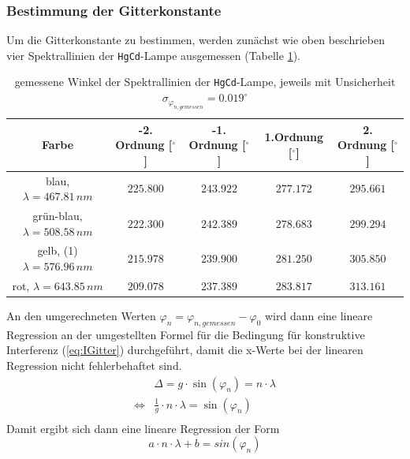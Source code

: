 \documentclass[a4paper, 11pt]{article}
\begin{document}
\subsubsection{Bestimmung der Gitterkonstante}
Um die Gitterkonstante zu bestimmen, werden zunächst wie oben beschrieben vier Spektrallinien der \texttt{HgCd}-Lampe ausgemessen (Tabelle \ref{table: gemWinkel}).
\begin{table}[H]
	\large
	\centering
	\begin{tabular}{|c|c|c|c|c|}
		\hline 
		Farbe & -2. Ordnung [$ ^\circ$]  &   -1. Ordnung [$ ^\circ$] &   1.Ordnung [$ ^\circ$]    &   2. Ordnung [$ ^\circ$] \\
		\hline
		blau, $\lambda = 467.81 \, nm$    &   $225.800 $   &   $243.922$    &   $277.172$    &   $295.661$ \\
		\hline grün-blau, $\lambda = 508.58 \, nm$    &   $222.300 $   &   $242.389$    &   $278.683$    &   $299.294$ \\
		\hline
		gelb, (1) $\lambda = 576.96 \, nm$    &   $215.978 $   &   $239.900$    &   $281.250$    &   $305.850$ \\
		\hline
		rot, $\lambda = 643.85 \, nm$    &   $209.078 $   &   $237.389$    &   $283.817$    &   $313.161$ \\
		\hline
	\end{tabular}
	\caption{gemessene Winkel der Spektrallinien der \texttt{HgCd}-Lampe, jeweils mit Unsicherheit $\sigma_{\varphi_{n, gemessen}} = 0.019^{\circ}$}
	\label{table: gemWinkel}
\end{table}

An den umgerechneten Werten $\varphi_n = \varphi_{n, gemessen} - \varphi_0$ wird dann eine lineare Regression an der umgestellten Formel für die Bedingung für konstruktive Interferenz (\ref{eq:IGitter}) durchgeführt, damit die x-Werte bei der linearen Regression nicht fehlerbehaftet sind.
\begin{eqnarray*}
& \Delta = g \cdot \sin(\varphi_n) = n \cdot \lambda \\
\Leftrightarrow & \frac{1}{g} \cdot n \cdot \lambda = \sin(\varphi_n)\\
\end{eqnarray*}
\textwidth
Damit ergibt sich dann eine lineare Regression der Form
\begin{equation*}
a \cdot n \cdot \lambda + b = sin(\varphi_n)
\end{equation*}
\end{document}
